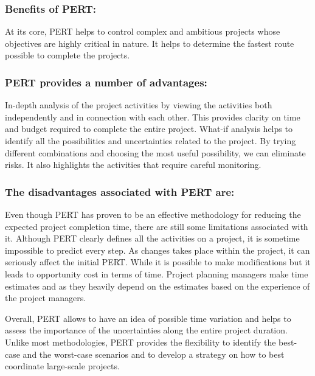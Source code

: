 \subsubsection{Benefits of PERT:}

At its core, PERT helps to control complex and ambitious projects whose objectives are highly critical in nature. It helps to determine the fastest route possible to complete the projects.

\subsubsection{PERT provides a number of advantages: }
In-depth analysis of the project activities by viewing the activities both independently and in connection with each other. This provides clarity on time and budget required to complete the entire project.
What-if analysis helps to identify all the possibilities and uncertainties related to the project. By trying different combinations and choosing the most useful possibility, we can eliminate risks. It also highlights the activities that require careful monitoring.


\subsubsection{The disadvantages associated with PERT are:}

Even though PERT has proven to be an effective methodology for reducing the expected project completion time, there are still some limitations associated with it.
Although PERT clearly defines all the activities on a project, it is sometime impossible to predict every step. As changes takes place within the project, it can seriously affect the initial PERT. While it is possible to make modifications but it leads to opportunity cost in terms of time.
Project planning managers make time estimates and as they heavily depend on the estimates based on the experience of the project managers.

Overall, PERT allows to have an idea of possible time variation and helps to assess the importance of the uncertainties along the entire project duration. Unlike most methodologies, PERT provides the flexibility to identify the best-case and the worst-case scenarios and to develop a strategy on how to best coordinate large-scale projects. 



